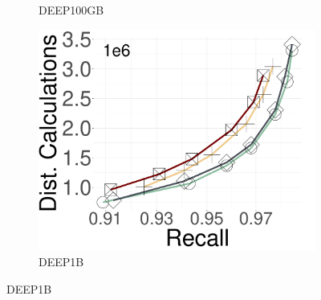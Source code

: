 \begin{figure}[h!]
\begin{subfigure}{0.28\columnwidth}
		\caption{{DEEP100GB}}
		\label{fig:ND:deep100GB}
		\end{subfigure}	
  \hspace{0.5cm}
		\begin{subfigure}{0.28\columnwidth}
			\centering
			\captionsetup{justification=centering}	
			\includegraphics[width=\textwidth]{../img/Experiments/RNG/DC_DEEP1B.pdf}
		\caption{{DEEP1B}}%
		\label{fig:ND:deep1b}	
  \end{subfigure}	
 

\end{figure}
